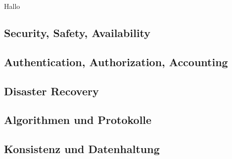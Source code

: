 \documentclass[letterpaper, 12pt]{article}
\let\tempsubsection\subsection
\renewcommand\subsection[1]{\vspace{0cm}\tempsubsection{#1}\vspace{0cm}}
\begin{document}
Hallo

\subsection{Security, Safety, Availability}

\subsection{Authentication, Authorization, Accounting}

\subsection{Disaster Recovery}

\subsection{Algorithmen und Protokolle}

\subsection{Konsistenz und Datenhaltung}

\clearpage


\end{document}
